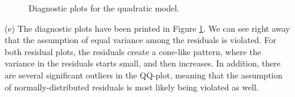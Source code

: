 \documentclass[10pt]{article}
\begin{document}
\begin{itemize}
\begin{figure}[ht]
        \caption{Diagnostic plots for the quadratic model.}
        \label{fig-q01-diag}
    \end{figure}
    \item[(e)] The diagnostic plots have been printed in Figure \ref{fig-q01-diag}. We can see right away that the assumption of equal variance among the 
    residuals is violated. For both residual plots, the residuals create a cone-like pattern, where the variance in the residuals starts small, and then 
    increases. In addition, there are several significant outliers in the QQ-plot, meaning that the assumption of normally-distributed residuals is most 
    likely being violated as well. 
\end{itemize}


\end{document}
